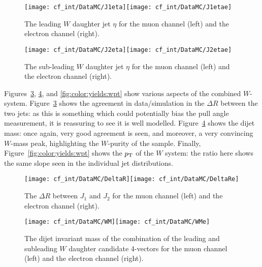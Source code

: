 \begin{figure}[h!]
\begin{center}
\texttt{[image: cf\_int/DataMC/J1eta]}\texttt{[image: cf\_int/DataMC/J1etae]}
 \caption{The leading $W$ daughter jet $\eta$ for the muon channel (left) and the electron channel (right).}
 \label{fig:color:yields:etas}
  \end{center}
\end{figure}

\begin{figure}[h!]
\begin{center}
\texttt{[image: cf\_int/DataMC/J2eta]}\texttt{[image: cf\_int/DataMC/J2etae]}
 \caption{The sub-leading $W$ daughter jet $\eta$ for the muon channel (left) and the electron channel (right).}
 \label{fig:color:yields:etas_sub}
  \end{center}
\end{figure}



Figures~\ref{fig:color:yields:deltaR}, \ref{fig:color:yields:mass}, and \ref{fig:color:yields:wpt} show various aspects of the combined $W$-system. Figure~\ref{fig:color:yields:deltaR} shows the agreement in data/simulation in the $\Delta R$ between the two jets: as this is something which could potentially bias the pull angle measurement, it is reassuring to see it is well modelled. Figure~\ref{fig:color:yields:mass} shows the dijet mass: once again, very good agreement is seen, and moreover, a very convincing $W$-mass peak, highlighting the $W$-purity of the sample. Finally, Figure~\ref{fig:color:yields:wpt} shows the $p_{\text{T}}$ of the $W$ system: the ratio here shows the same slope seen in the individual jet distributions.


\begin{figure}[h!]
\begin{center}
\texttt{[image: cf\_int/DataMC/DeltaR]}\texttt{[image: cf\_int/DataMC/DeltaRe]}
 \caption{The $\Delta R$ between $J_1$ and $J_2$ for the muon channel (left) and the electron channel (right).}
 \label{fig:color:yields:deltaR}
  \end{center}
\end{figure}

\begin{figure}[h!]
\begin{center}
\texttt{[image: cf\_int/DataMC/WM]}\texttt{[image: cf\_int/DataMC/WMe]}
 \caption{The dijet invariant mass of the combination of the leading and subleading $W$ daughter candidate 4-vectors for the muon channel (left) and the electron channel (right).}
 \label{fig:color:yields:mass}
  \end{center}
\end{figure}

